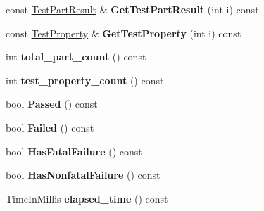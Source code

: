 \begin{DoxyCompactItemize}
\item 
\hypertarget{classtesting_1_1_test_result_a5ea65e4a7c4fc9c9dc9578223a599a7c}{}const \hyperlink{classtesting_1_1_test_part_result}{Test\+Part\+Result} \& {\bfseries Get\+Test\+Part\+Result} (int i) const \label{classtesting_1_1_test_result_a5ea65e4a7c4fc9c9dc9578223a599a7c}

\item 
\hypertarget{classtesting_1_1_test_result_a89a4f580a5d969b36e016cd309b235bd}{}const \hyperlink{classtesting_1_1_test_property}{Test\+Property} \& {\bfseries Get\+Test\+Property} (int i) const \label{classtesting_1_1_test_result_a89a4f580a5d969b36e016cd309b235bd}

\item 
\hypertarget{classtesting_1_1_test_result_ae6a378ec743edfbed55890c955d0adc8}{}int {\bfseries total\+\_\+part\+\_\+count} () const \label{classtesting_1_1_test_result_ae6a378ec743edfbed55890c955d0adc8}

\item 
\hypertarget{classtesting_1_1_test_result_a5075f9d595d51c7cc2f5c0921e622831}{}int {\bfseries test\+\_\+property\+\_\+count} () const \label{classtesting_1_1_test_result_a5075f9d595d51c7cc2f5c0921e622831}

\item 
\hypertarget{classtesting_1_1_test_result_aa46a04342f02ec297357f47288da3ef3}{}bool {\bfseries Passed} () const \label{classtesting_1_1_test_result_aa46a04342f02ec297357f47288da3ef3}

\item 
\hypertarget{classtesting_1_1_test_result_abb5d051bf958071c14020132a4d6cc07}{}bool {\bfseries Failed} () const \label{classtesting_1_1_test_result_abb5d051bf958071c14020132a4d6cc07}

\item 
\hypertarget{classtesting_1_1_test_result_ace61ce992083a9124f9ff0e99a2041cc}{}bool {\bfseries Has\+Fatal\+Failure} () const \label{classtesting_1_1_test_result_ace61ce992083a9124f9ff0e99a2041cc}

\item 
\hypertarget{classtesting_1_1_test_result_a34e6901b9772f51ce4f17a5517c26607}{}bool {\bfseries Has\+Nonfatal\+Failure} () const \label{classtesting_1_1_test_result_a34e6901b9772f51ce4f17a5517c26607}

\item 
\hypertarget{classtesting_1_1_test_result_a582f6383265d0619df812b75499d0616}{}Time\+In\+Millis {\bfseries elapsed\+\_\+time} () const \label{classtesting_1_1_test_result_a582f6383265d0619df812b75499d0616}


\end{DoxyCompactItemize}

